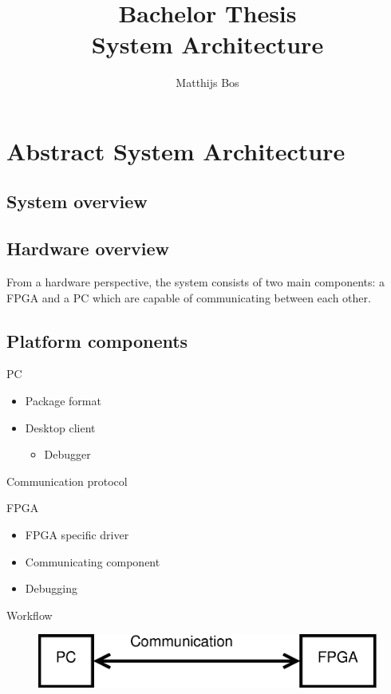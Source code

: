\documentclass[singleside,openright]{uva-bachelor-thesis}
\title{Bachelor Thesis\\System Architecture}
\author{Matthijs Bos}
\begin{document}
\maketitle

\tableofcontents

\chapter{Abstract System Architecture}

\section{System overview}


\section{Hardware overview}
From a hardware perspective, the system consists of two main components: a FPGA and a PC which are capable of communicating between each other.

\section{}

\section{Platform components}

PC
\begin{itemize}
\item Package format
\item Desktop client
\begin{itemize}
\item Debugger
\end{itemize}
\end{itemize}

Communication protocol

FPGA
\begin{itemize}
\item FPGA specific driver
\item Communicating component
\item Debugging
\end{itemize}

Workflow



\begin{figure}
\centering
\includegraphics[width=\textwidth]{hardware.eps}
\caption{}
\label{fig:hardware}
\end{figure}

\printbibliography
\end{document}
